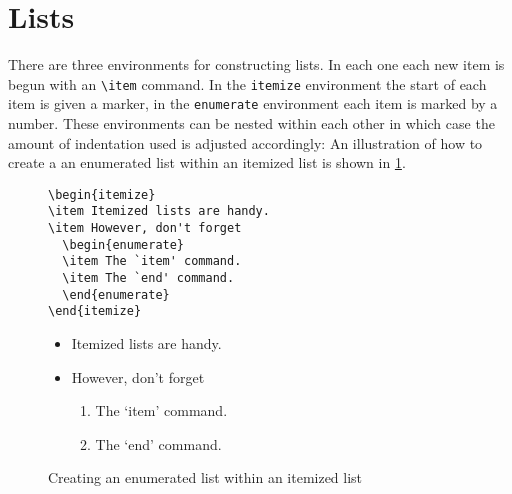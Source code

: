 \section{Lists}
There are three environments for constructing lists.  In each one each new
item is begun with an \verb|\item| command.  In the {\tt itemize} environment
the start of each item is given a marker, in the {\tt enumerate}
environment each item is marked by a number.  These environments can be nested
within each other in which case the amount of indentation used
is adjusted accordingly:
An illustration of how to create a an enumerated list within an itemized
list is shown in \ref{fig:list}.
\begin{figure}
\footnotesize
\begin{minipage}[t]{0.48\textwidth}
\begin{verbatim}
\begin{itemize}
\item Itemized lists are handy.
\item However, don't forget
  \begin{enumerate}
  \item The `item' command.
  \item The `end' command.
  \end{enumerate}
\end{itemize}
\end{verbatim}
\end{minipage}\hfill
\begin{minipage}[t]{0.48\textwidth}
\begin{itemize}
\item Itemized lists are handy.
\item However, don't forget
  \begin{enumerate}
  \item The `item' command.
  \item The `end' command.
  \end{enumerate}
\end{itemize}
\end{minipage}
\vspace{1em}
\caption{Creating an enumerated list within an itemized list}
\label{fig:list}
\end{figure}
 

